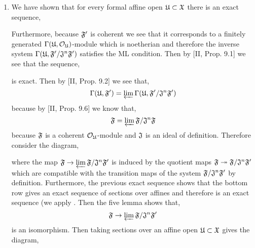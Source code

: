 \documentclass[12pt]{article}
\begin{document}
\begin{enumerate}
\item We have shown that for every formal affine open $\mathfrak{U} \subset \mathfrak{X}$ there is an exact sequence,
\begin{center}
\end{center}
Furthermore, because $\mathfrak{F}'$ is coherent we see that it corresponds to a finitely generated $\Gamma(\mathfrak{U}, \mathcal{O}_{\mathfrak{U}})$-module which is noetherian and therefore the inverse system $\Gamma(\mathfrak{U}, \mathfrak{F}'/\mathfrak{J}^n \mathfrak{F}')$ satisfies the ML condition. Then by [II, Prop. 9.1] we see that the sequence,
\begin{center}
\end{center}
is exact. Then by [II, Prop. 9.2] we see that, 
\[ \Gamma(\mathfrak{U}, \mathfrak{F}') = \varprojlim \Gamma(\mathfrak{U}, \mathfrak{F}'/\mathfrak{J}^n \mathfrak{F}') \]
because by [II, Prop. 9.6] we know that,
\[ \mathfrak{F} = \varprojlim \mathfrak{F} / \mathfrak{J}^n \mathfrak{F} \]
because $\mathfrak{F}$ is a coherent $\mathcal{O}_{\mathfrak{U}}$-module and $\mathfrak{J}$ is an ideal of definition. Therefore consider the diagram,
\begin{center}
\end{center}
where the map $\mathfrak{F} \to \varprojlim \mathfrak{F} /\mathfrak{J}^n \mathfrak{F}'$ is induced by the quotient maps $\mathfrak{F} \twoheadrightarrow \mathfrak{F} / \mathfrak{J}^n \mathfrak{F}'$ which are compatible with the transition maps of the system $\mathfrak{F}/\mathfrak{J}^n \mathfrak{F}'$ by definition. Furthermore, the previous exact sequence shows that the bottom row gives an exact sequence of sections over affines and therefore is an exact sequence (we apply . Then the five lemma shows that,
\[ \mathfrak{F} \to \varprojlim \mathfrak{F} /\mathfrak{J}^n \mathfrak{F}' \]
is an isomorphism. Then taking sections over an affine open $\mathfrak{U} \subset \mathfrak{X}$ gives the diagram,
\begin{center}
\end{center}
\end{enumerate}
\end{document}
